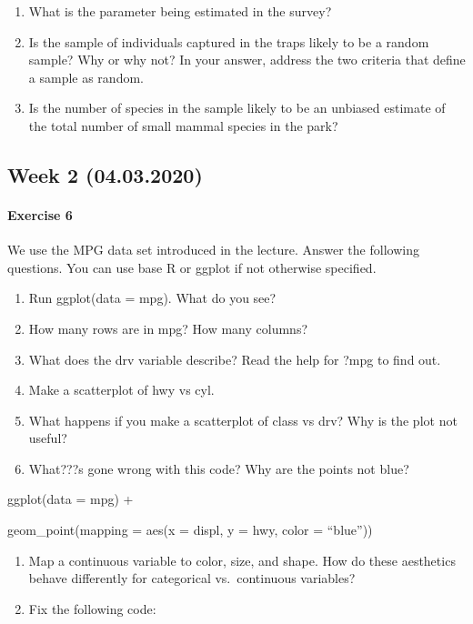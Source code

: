 \documentclass[]{article}
\providecommand{\tightlist}{%
  \setlength{\itemsep}{0pt}\setlength{\parskip}{0pt}}
\let\oldparagraph\paragraph
\renewcommand{\paragraph}[1]{\oldparagraph{#1}\mbox{}}
\begin{document}
\begin{enumerate}
\def\labelenumi{\alph{enumi})}
\item
  What is the parameter being estimated in the survey?
\item
  Is the sample of individuals captured in the traps likely to be a
  random sample? Why or why not? In your answer, address the two
  criteria that define a sample as random.
\item
  Is the number of species in the sample likely to be an unbiased
  estimate of the total number of small mammal species in the park?
\end{enumerate}

\hypertarget{week-2-04.03.2020}{%
\subsection{Week 2 (04.03.2020)}\label{week-2-04.03.2020}}

\hypertarget{exercise-6}{%
\paragraph{Exercise 6}\label{exercise-6}}

We use the MPG data set introduced in the lecture. Answer the following
questions. You can use base R or ggplot if not otherwise specified.

\begin{enumerate}
\def\labelenumi{\alph{enumi})}
\item
  Run ggplot(data = mpg). What do you see?
\item
  How many rows are in mpg? How many columns?
\item
  What does the drv variable describe? Read the help for ?mpg to find
  out.
\item
  Make a scatterplot of hwy vs cyl.
\item
  What happens if you make a scatterplot of class vs drv? Why is the
  plot not useful?
\item
  What???s gone wrong with this code? Why are the points not blue?
\end{enumerate}

ggplot(data = mpg) +

geom\_point(mapping = aes(x = displ, y = hwy, color = ``blue''))

\begin{enumerate}
\def\labelenumi{\alph{enumi})}
\setcounter{enumi}{6}
\tightlist
\item
  Map a continuous variable to color, size, and shape. How do these
  aesthetics behave differently for categorical vs.~continuous
  variables?
\item
  Fix the following code:
\end{enumerate}
\end{document}
